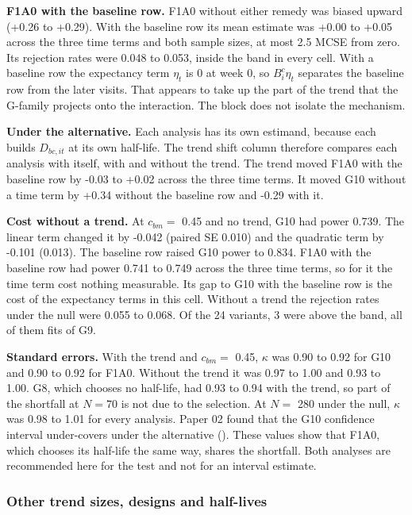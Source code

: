 \documentclass[
  11pt,
]{article}
\begin{document}
\textbf{F1A0 with the baseline row.} F1A0 without either remedy was biased
upward (+0.26 to +0.29). With the baseline row its mean estimate was
+0.00 to +0.05 across the three time terms and both sample sizes,
at most 2.5 MCSE from zero. Its rejection rates were
0.048 to 0.053, inside the band in every cell. With a baseline row
the expectancy term \(\eta_t\) is 0 at week 0, so \(B^c_i\eta_t\)
separates the baseline row from the later visits. That appears to
take up the part of the trend that the G-family projects onto the
interaction. The block does not isolate the mechanism.

\textbf{Under the alternative.} Each analysis has its own estimand, because
each builds \(D_{bc,it}\) at its own half-life. The trend shift column
therefore compares each analysis with itself, with and without the
trend. The trend moved F1A0 with the baseline row by -0.03 to +0.02
across the three time terms. It moved G10 without a time term by
+0.34 without the baseline row and -0.29
with it.

\textbf{Cost without a trend.} At \(c_{bm} =\) 0.45 and no trend,
G10 had power 0.739. The linear term changed it by
-0.042 (paired SE 0.010) and the quadratic term by
-0.101 (0.013). The baseline row raised G10 power to
0.834. F1A0 with the baseline row had power
0.741 to 0.749 across the three time terms, so for it the time term
cost nothing measurable. Its gap to G10 with the baseline row is the
cost of the expectancy terms in this cell. Without a trend the
rejection rates under the null were 0.055 to 0.068. Of the 24
variants, 3 were above the band, all of them fits of
G9.

\textbf{Standard errors.} With the trend and \(c_{bm} =\) 0.45,
\(\kappa\) was 0.90 to 0.92 for G10 and 0.90 to 0.92 for F1A0.
Without the trend it was 0.97 to 1.00 and 0.93 to 1.00. G8,
which chooses no half-life, had 0.93 to 0.94 with the trend, so part
of the shortfall at \(N = 70\) is not due to the selection. At \(N =\)
280 under the null, \(\kappa\) was 0.98 to 1.01 for
every analysis. Paper 02 found that the G10 confidence interval
under-covers under the alternative (). These
values show that F1A0, which chooses its half-life the same way,
shares the shortfall. Both analyses are recommended here for the test
and not for an interval estimate.

\subsubsection{Other trend sizes, designs and half-lives}\label{sec-bmtr}
\end{document}
